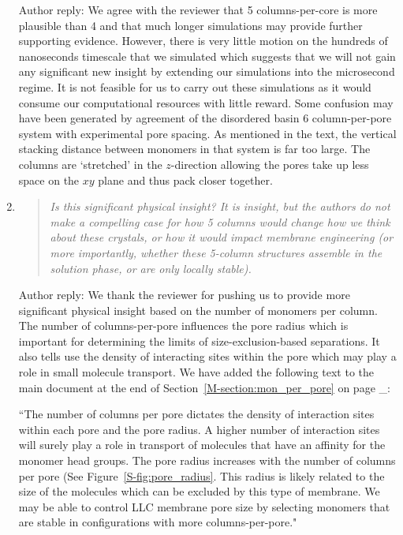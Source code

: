 \documentclass{article}
\begin{document}
\begin{enumerate}
    Author reply: We agree with the reviewer that 5 columns-per-core is more
    plausible than 4 and that much longer simulations may provide further
    supporting evidence. However, there is very little motion on the hundreds of
    nanoseconds timescale that we simulated which suggests that we will not gain
    any significant new insight by extending our simulations into the microsecond
    regime. It is not feasible for us to carry out these simulations as it would
    consume our computational resources with little reward.
    Some confusion may have been generated by agreement of the disordered basin
    6 column-per-pore system with experimental pore spacing. As mentioned in the
    text, the vertical stacking distance between monomers in that system is far too
    large. The columns are `stretched' in the $z$-direction allowing the pores take
    up less space on the $xy$ plane and thus pack closer together.  
    
    \item \begin{quote}    
    \textit{Is this significant physical insight? It is insight, but the
	    authors do not make a compelling case for how 5 columns would change how we
	    think about these crystals, or how it would impact membrane engineering (or
	    more importantly, whether these 5-column structures assemble in the solution
	    phase, or are only locally stable).}
    \end{quote}
    
    Author reply: We thank the reviewer for pushing us to provide more
    significant physical insight based on the number of monomers per column. The
    number of columns-per-pore influences the pore radius which is important for
    determining the limits of size-exclusion-based separations. It also tells use
    the density of interacting sites within the pore which may play a role in small
    molecule transport. We have added the following text to the main document at
    the end of Section~\ref{M-section:mon_per_pore} on page \_:
    
    ``The number of columns per pore dictates the density of interaction sites
    within each pore and the pore radius. A higher number of interaction sites will
    surely play a role in transport of molecules that have an affinity for the
    monomer head groups.  The pore radius increases with the number of columns per
    pore (See Figure~\ref{S-fig:pore_radius}.  This radius is likely related to the
    size of the molecules which can be excluded by this type of membrane. We may be
    able to control LLC membrane pore size by selecting monomers that are stable in
    configurations with more columns-per-pore."
    

\end{enumerate}
\end{document}
